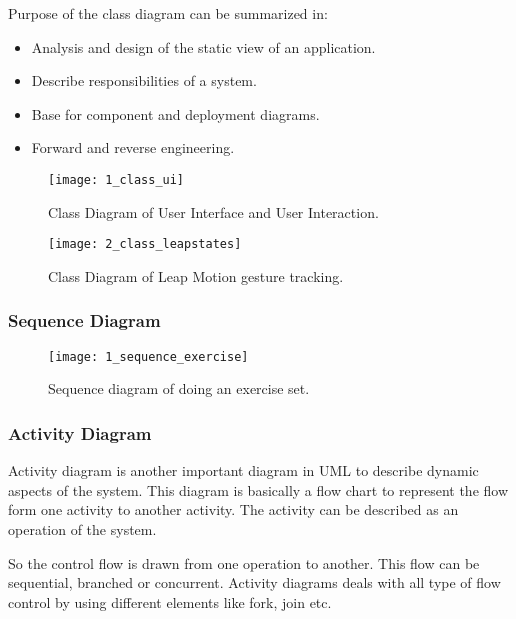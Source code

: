 Purpose of the class diagram can be summarized in:

\begin{itemize}
\item Analysis and design of the static view of an application.
\item Describe responsibilities of a system.
\item Base for component and deployment diagrams.
\item Forward and reverse engineering.
\end{itemize}




\begin{figure}[!h]
\centering
\texttt{[image: 1\_class\_ui]}
\caption{Class Diagram of User Interface and User Interaction.}\label{class_ui}
\end{figure}

\clearpage

\begin{figure}[!h]
\centering
\texttt{[image: 2\_class\_leapstates]}
\caption{Class Diagram of Leap Motion gesture tracking.}\label{class_leap}
\end{figure}

\clearpage

\subsubsection{Sequence Diagram}
\begin{figure}[!h]
\centering
\texttt{[image: 1\_sequence\_exercise]}
\caption{Sequence diagram of doing an exercise set.}\label{sequence_exercise}
\end{figure}

\clearpage

\subsubsection{Activity Diagram}
Activity diagram is another important diagram in UML to describe dynamic aspects of the system. This diagram is basically a flow chart to represent the flow form one activity to another activity. The activity can be described as an operation of the system.

So the control flow is drawn from one operation to another. This flow can be sequential, branched or concurrent. Activity diagrams deals with all type of flow control by using different elements like fork, join etc.


